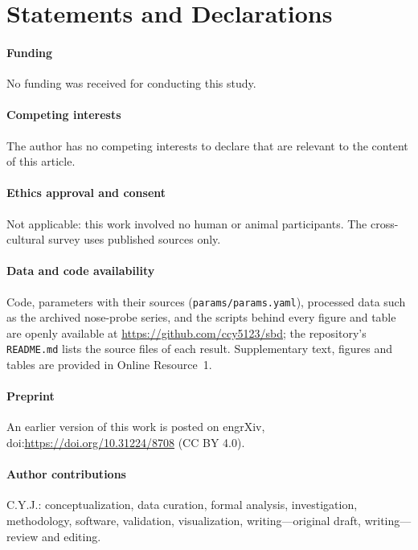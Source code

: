 \section*{Statements and Declarations}

\paragraph{Funding} No funding was received for conducting this study.

\paragraph{Competing interests} The author has no competing interests to declare that are relevant to the content
of this article.

\paragraph{Ethics approval and consent} Not applicable: this work involved no human or animal participants. The
cross-cultural survey uses published sources only.

\paragraph{Data and code availability} Code, parameters with their sources (\texttt{params/params.yaml}), processed
data such as the archived nose-probe series, and the scripts behind every figure and table are openly available at
\url{https://github.com/ccy5123/sbd}; the repository's \texttt{README.md} lists the source files of each result.
Supplementary text, figures and tables are provided in Online Resource~1.

\paragraph{Preprint} An earlier version of this work is posted on engrXiv, doi:\url{https://doi.org/10.31224/8708}
(CC BY 4.0).

\paragraph{Author contributions} C.Y.J.: conceptualization, data curation, formal analysis, investigation,
methodology, software, validation, visualization, writing---original draft, writing---review and editing.
